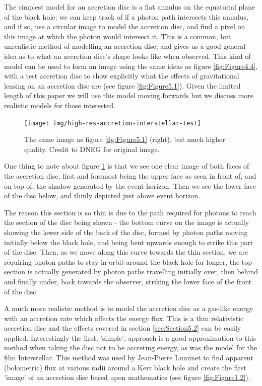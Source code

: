 \documentclass[oneside,openright,frontopenright, singlespacing]{dmathesis}
\begin{document}
	The simplest model for an accretion disc is a flat annulus on the equatorial plane of the black hole; we can keep track of if a photon path intersects this annulus, and if so, use a circular image to model the accretion disc, and find a pixel on this image at which the photon would intersect it. This is a common, but unrealistic method of modelling an accretion disc, and gives us a good general idea as to what an accretion disc's shape looks like when observed. This kind of model can be used to form an image using the same ideas as figure \ref{fig:Figure4.4}, with a test accretion disc to show explicitly what the effects of gravitational lensing on an accretion disc are (see figure \ref{fig:Figure5.1}). Given the limited length of this paper we will use this model moving forwards but we discuss more realistic models for those interested.

\begin{figure}[!ht]
	\centering
	\texttt{[image: img/high-res-accretion-interstellar-test]}
	\caption{The same image as figure \ref{fig:Figure5.1} (right), but much higher quality. Credit to DNEG for original image\cite{thorne2015gravitational}.}
	\label{fig:Figure5.2}
\end{figure}

	One thing to note about figure \ref{fig:Figure5.2} is that we see one clear image of both faces of the accretion disc, first and foremost being the upper face as seen in front of, and on top of, the shadow generated by the event horizon. Then we see the lower face of the disc below, and thinly depicted just above event horizon. 

\vspace{1em}
	The reason this section is so thin is due to the path required for photons to reach the section of the disc being shown - the bottom curve on the image is actually showing the lower side of the back of the disc, formed by photon paths moving initially below the black hole, and being bent upwards enough to strike this part of the disc. Then, as we move along this curve towards the thin section, we are requiring photon paths to stay in orbit around the black hole for longer, the top section is actually generated by photon paths travelling initially over, then behind and finally under, back towards the observer, striking the lower face of the front of the disc.

\vspace{1em}
	A much more realistic method is to model the accretion disc as a gas-like energy with an accretion rate which affects the energy flux. This is a thin relativistic accretion disc and the effects covered in section \ref{sec:Section5.2} can be easily applied. Interestingly the first, 'simple', approach is a good approximation to this method when taking the disc not to be accreting energy, as was the model for the film Interstellar. This method was used by Jean-Pierre Luminet to find apparent (bolometric) flux at various radii around a Kerr black hole and create the first 'image' of an accretion disc based upon mathematics\cite{luminet1979image} (see figure \ref{fig:Figure1.2}).
\end{document}
